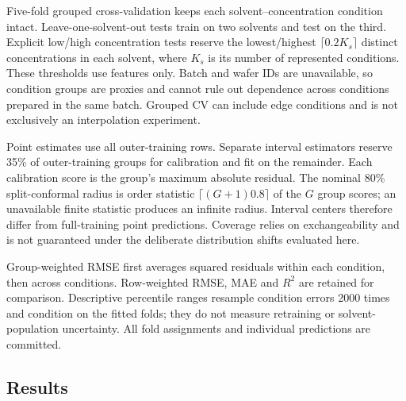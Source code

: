 Five-fold grouped cross-validation keeps each solvent--concentration condition intact. Leave-one-solvent-out tests train on two solvents and test on the third. Explicit low/high concentration tests reserve the lowest/highest $\lceil0.2K_s\rceil$ distinct concentrations in each solvent, where $K_s$ is its number of represented conditions. These thresholds use features only. Batch and wafer IDs are unavailable, so condition groups are proxies and cannot rule out dependence across conditions prepared in the same batch. Grouped CV can include edge conditions and is not exclusively an interpolation experiment.

Point estimates use all outer-training rows. Separate interval estimators reserve 35\% of outer-training groups for calibration and fit on the remainder. Each calibration score is the group's maximum absolute residual. The nominal 80\% split-conformal radius is order statistic $\lceil(G+1)0.8\rceil$ of the $G$ group scores; an unavailable finite statistic produces an infinite radius. Interval centers therefore differ from full-training point predictions. Coverage relies on exchangeability and is not guaranteed under the deliberate distribution shifts evaluated here.

Group-weighted RMSE first averages squared residuals within each condition, then across conditions. Row-weighted RMSE, MAE and $R^2$ are retained for comparison. Descriptive percentile ranges resample condition errors 2000 times and condition on the fitted folds; they do not measure retraining or solvent-population uncertainty. All fold assignments and individual predictions are committed.

\subsection{Results}

